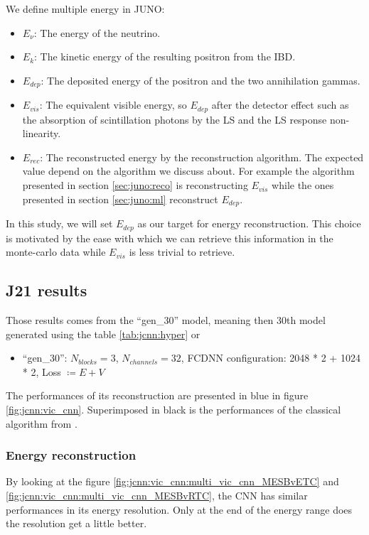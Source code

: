 \documentclass[../main.tex]{subfiles}
\begin{document}
We define multiple energy in JUNO:
\begin{itemize}
  \item $E_\nu$: The energy of the neutrino.
  \item $E_k$: The kinetic energy of the resulting positron from the IBD.
  \item $E_{dep}$: The deposited energy of the positron and the two annihilation gammas.
  \item $E_{vis}$: The equivalent visible energy, so $E_{dep}$ after the detector effect such as the absorption of scintillation photons by the LS and the LS response non-linearity.
  \item $E_{rec}$: The reconstructed energy by the reconstruction algorithm. The expected value depend on the algorithm we discuss about. For example the algorithm presented in section \ref{sec:juno:reco} is reconstructing $E_{vis}$ while the ones presented in section \ref{sec:juno:ml} reconstruct $E_{dep}$.
\end{itemize}

In this study, we will set $E_{dep}$ as our target for energy reconstruction. This choice is motivated by the ease with which we can retrieve this information in the monte-carlo data while $E_{vis}$ is less trivial to retrieve.

\subsection{J21 results}

Those results comes from the ``gen\_30'' model, meaning then 30th model generated using the table \ref{tab:jcnn:hyper} or
\begin{itemize}
 \item ``gen\_30'': $N_{blocks} = 3$, $N_{channels} = 32$, FCDNN configuration: 2048 * 2 + 1024 * 2, Loss $\coloneq E+V$
\end{itemize}

The performances of its reconstruction are presented in blue in figure \ref{fig:jcnn:vic_cnn}. Superimposed in black is the performances of the classical algorithm from \cite{lebrin_towards_2022}.

\subsubsection{Energy reconstruction}

By looking at the figure \ref{fig:jcnn:vic_cnn:multi_vic_cnn_MESBvETC} and \ref{fig:jcnn:vic_cnn:multi_vic_cnn_MESBvRTC}, the CNN has similar performances in its energy resolution. Only at the end of the energy range does the resolution get a little better.
\end{document}
